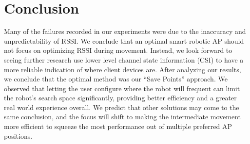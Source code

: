 \section{Conclusion}
Many of the failures recorded in our experiments were due to the inaccuracy and unpredictability of RSSI. We conclude that an optimal smart robotic AP should not focus on optimizing RSSI during movement. Instead, we look forward to seeing further research use lower level channel state information (CSI) to have a more reliable indication of where client devices are. After analyzing our results, we conclude that the optimal method was our “Save Points” approach. We observed that letting the user configure where the robot will frequent can limit the robot’s search space significantly, providing better efficiency and a greater real world experience overall. We predict that other solutions may come to the same conclusion, and the focus will shift to making the intermediate movement more efficient to squeeze the most performance out of multiple preferred AP positions.

